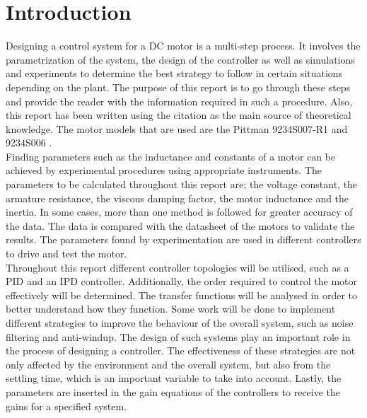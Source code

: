 \section{Introduction}

Designing a control system for a DC motor is a multi-step process. 
It involves the parametrization of the system, the design of the controller as well as simulations and experiments to determine the best strategy to follow in certain situations depending on the plant. 
The purpose of this report is to go through these steps and provide the reader with the information required in such a procedure. 
Also, this report has been written using the citation \cite{feedback} as the main source of theoretical knowledge. 
The motor models that are used are the Pittman 9234S007-R1 and 9234S006 \cite{pittmann}.
\\

Finding parameters such as the inductance and constants of a motor can be achieved by experimental procedures using appropriate instruments. 
The parameters to be calculated throughout this report are; the voltage constant, the armature resistance, the viscous damping factor, the motor inductance and the inertia. 
In some cases, more than one method is followed for greater accuracy of the data. 
The data is compared with the datasheet of the motors to validate the results. 
The parameters found by experimentation are used in different controllers to drive and test the motor. 
\\

Throughout this report different controller topologies will be utilised, such as a PID and an IPD controller. 
Additionally, the order required to control the motor effectively will be determined. 
The transfer functions will be analysed in order to better understand how they function.
Some work will be done to implement different strategies to improve the behaviour of the overall system, such as noise filtering and anti-windup. 
The design of such systems play an important role in the process of designing a controller. 
The effectiveness of these strategies are not only affected by the environment and the overall system, but also from the settling time, which is an important variable to take into account. 
Lastly, the parameters are inserted in the gain equations of the controllers to receive the gains for a specified system.
\\

